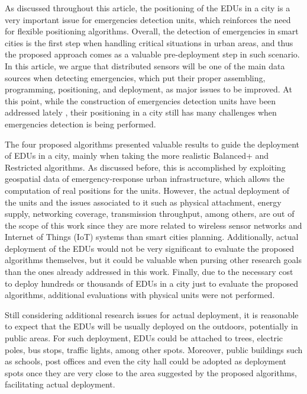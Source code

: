 \begin{refsection}
As discussed throughout this article, the positioning of the EDUs in a city is a very important issue for emergencies detection units, which reinforces the need for flexible positioning algorithms. Overall, the detection of emergencies in smart cities is the first step when handling critical situations in urban areas, and thus the proposed approach comes as a valuable pre-deployment step in such scenario. In this article, we argue that distributed sensors will be one of the main data sources when detecting emergencies, which put their proper assembling, programming, positioning, and deployment, as major issues to be improved. At this point, while the construction of emergencies detection units have been addressed lately \cite{hardware1,hardware2}, their positioning in a city still has many challenges when emergencies detection is being performed.

The four proposed algorithms presented valuable results to guide the deployment of EDUs in a city, mainly when taking the more realistic Balanced+ and Restricted algorithms. As discussed before, this is accomplished by exploiting geospatial data of emergency-response urban infrastructure, which allows the computation of real positions for the units. However, the actual deployment of the units and the issues associated to it such as physical attachment, energy supply, networking coverage, transmission throughput, among others, are out of the scope of this work since they are more related to wireless sensor networks and Internet of Things (IoT) systems than smart cities planning. Additionally, actual deployment of the EDUs would not be very significant to evaluate the proposed algorithms themselves, but it could be valuable when pursing other research goals than the ones already addressed in this work. Finally, due to the necessary cost to deploy hundreds or thousands of EDUs in a city just to evaluate the proposed algorithms, additional evaluations with physical units were not performed.

Still considering additional research issues for actual deployment, it is reasonable to expect that the EDUs will be usually deployed on the outdoors, potentially in public areas. For such deployment, EDUs could be attached to trees, electric poles, bus stops, traffic lights, among other spots. Moreover, public buildings such as schools, post offices and even the city hall could be adopted as deployment spots once they are very close to the area suggested by the proposed algorithms, facilitating actual deployment. 


\end{refsection}
